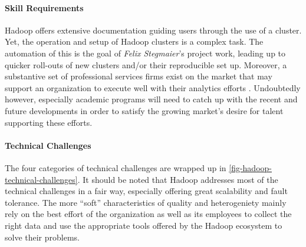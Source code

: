 \paragraph{Skill Requirements}
Hadoop offers extensive documentation guiding users through the use of a cluster. Yet, the operation and setup of Hadoop clusters is a complex task. The automation of this is the goal of \emph{Felix Stegmaier}'s project work, leading up to quicker roll-outs of new clusters and/or their reproducible set up. Moreover, a substantive set of professional services firms exist on the market that may support an organization to execute well with their analytics efforts \autocite{hadoopconsulting}. Undoubtedly however, especially academic programs will need to catch up with the recent and future developments in order to satisfy the growing market's desire for talent supporting these efforts.

\paragraph{Technical Challenges}
The four categories of technical challenges are wrapped up in \autoref{fig-hadoop-technical-challenges}. It should be noted that Hadoop addresses most of the technical challenges in a fair way, especially offering great scalability and fault tolerance. The more \enquote{soft} characteristics of quality and heterogeniety mainly rely on the best effort of the organization as well as its employees to collect the right data and use the appropriate tools offered by the Hadoop ecosystem to solve their problems.

